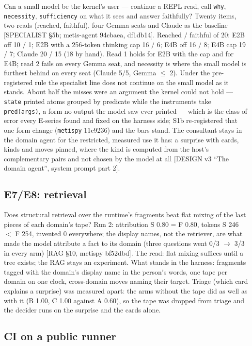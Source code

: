 \documentclass[11pt]{article}
\newcommand{\metispy}{\texttt{metispy}}
\newcommand{\src}[1]{{\footnotesize\textsf{[#1]}}}
\begin{document}
Can a small model be the kernel's user --- continue a REPL read, call \texttt{why},
\texttt{necessity}, \texttt{sufficiency} on what it sees and answer faithfully? Twenty
items, two reads (reached, faithful), four Gemma seats and Claude as the baseline
\src{SPECIALIST \S5b; metis-agent 94cbaea, df1db14}. Reached / faithful of 20: E2B off 10 /
1; E2B with a 256-token thinking cap 16 / 6; E4B off 16 / 8; E4B cap 19 / 7; Claude 20 /
15 (18 by hand). Read 1 holds for E2B with the cap and for E4B; read 2 fails on every Gemma
seat, and necessity is where the small model is furthest behind on every seat (Claude 5/5,
Gemma $\le$ 2). Under the pre-registered rule the specialist line does not continue on the
small model as it stands. About half the misses were an argument the kernel could not hold
--- \texttt{state} printed atoms grouped by predicate while the instruments take
\texttt{pred(args)}, a form no output the model saw ever printed --- which is the class of
error every E-series found and fixed on the harness side; S1b re-registered that one form
change (\metispy{} 11c9236) and the bars stand. The consultant stays in the domain agent for
the restricted, measured use it has: a surprise with cards, kinds and moves pinned, where the
kind is computed from the host's complementary pairs and not chosen by the model at all
\src{DESIGN v3 ``The domain agent'', system prompt part 2}.

\subsection{E7/E8: retrieval}\label{sec:rag}

Does structural retrieval over the runtime's fragments beat flat mixing of the last pieces
of each domain's tape? Run 2: attribution S 0.80 = F 0.80, tokens S 246 $<$ F 254, invented
0 everywhere; the display names, not the retriever, are what made the model attribute a
fact to its domain (three questions went 0/3 $\to$ 3/3 in every arm) \src{RAG \S10,
metispy bf52dbd}. The read: flat mixing suffices until a tree exists; the RAG stays an
experiment. What stands in the harness: fragments tagged with the domain's display name in
the person's words, one tape per domain on one clock, cross-domain moves naming their
target. Triage (which card explains a surprise) was measured apart: the arms without the
tape did as well as with it (B 1.00, C 1.00 against A 0.60), so the tape was dropped from
triage and the decider runs on the surprise and the cards alone.

\subsection{CI on a public runner}\label{sec:ci}
\end{document}
